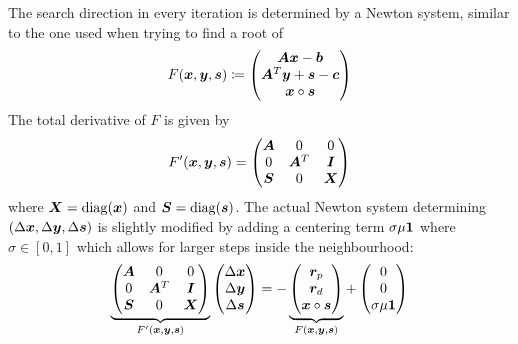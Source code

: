 The search direction in every iteration is determined by a Newton system, similar to the one used when trying to find a root of 
\begin{equation}
  F(\bm{x}, \bm{y}, \bm{s}) \coloneqq \begin{pmatrix} \bm{A}\bm{x} - \bm{b} \\ \bm{A}^T \bm{y} + \bm{s} - \bm{c} \\ \bm{x} \circ \bm{s} \end{pmatrix}
\end{equation}
The total derivative of \(F\) is given by
\begin{equation}
  F'(\bm{x}, \bm{y}, \bm{s}) = \begin{pmatrix}
    \bm{A} & 0         & 0       \\
    0       & \bm{A}^T & \bm{I} \\
    \bm{S} & 0         & \bm{X} \\
  \end{pmatrix}
\end{equation}
where \(\bm{X} = \operatorname{diag}(\bm{x})\) and \(\bm{S} = \operatorname{diag}(\bm{s})\).
The actual Newton system determining \((\Delta\bm{x}, \Delta\bm{y}, \Delta\bm{s})\) is slightly modified by adding a centering term \(\sigma \mu \bm{1}\) where \(\sigma \in [0,1]\) which allows for larger steps inside the neighbourhood:
\begin{equation} \label{eqn:newton-system}
  \underbrace{
  \begin{pmatrix}
    \bm{A} & 0         & 0       \\
    0       & \bm{A}^T & \bm{I} \\
    \bm{S} & 0         & \bm{X} \\
  \end{pmatrix}
  }_{F'(\bm{x}, \bm{y}, \bm{s})}
  \begin{pmatrix} \Delta\bm{x} \\ \Delta\bm{y} \\ \Delta\bm{s} \end{pmatrix}
  = -
  \underbrace{
  \begin{pmatrix} \bm{r}_p \\ \bm{r}_d \\ \bm{x} \circ \bm{s} \end{pmatrix}
  }_{F(\bm{x}, \bm{y}, \bm{s})}
  + \begin{pmatrix} 0 \\ 0 \\ \sigma \mu \bm{1} \end{pmatrix}
\end{equation}

